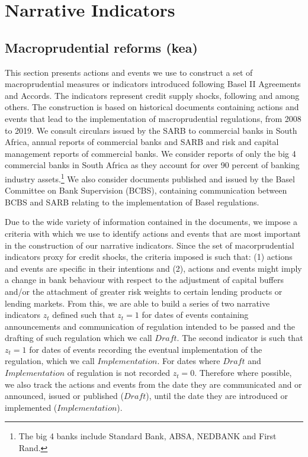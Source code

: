 \documentclass[
  letterpaper,
  DIV=11,
  numbers=noendperiod]{scrartcl}
\begin{document}
\section{Narrative Indicators}\label{narrative-indicators}

\subsection{Macroprudential reforms
(kea)}\label{macroprudential-reforms-kea}

This section presents actions and events we use to construct a set of
macroprudential measures or indicators introduced following Basel II
Agreements and Accords. The indicators represent credit supply shocks,
following \cite{noss2016estimating} and \cite{deli2017real} among
others. The construction is based on historical documents containing
actions and events that lead to the implementation of macroprudential
regulations, from 2008 to 2019. We consult circulars issued by the SARB
to commercial banks in South Africa, annual reports of commercial banks
and SARB and risk and capital management reports of commercial banks. We
consider reports of only the big 4 commercial banks in South Africa as
they account for over 90 percent of banking industry
assets.\footnote{The big 4 banks include Standard Bank, ABSA, NEDBANK and First Rand.}
We also consider documents published and issued by the Basel Committee
on Bank Supervision (BCBS), containing communication between BCBS and
SARB relating to the implementation of Basel regulations.

Due to the wide variety of information contained in the documents, we
impose a criteria with which we use to identify actions and events that
are most important in the construction of our narrative indicators.
Since the set of macorprudential indicators proxy for credit shocks, the
criteria imposed is such that: (1) actions and events are specific in
their intentions and (2), actions and events might imply a change in
bank behaviour with respect to the adjustment of capital buffers and/or
the attachment of greater risk weights to certain lending products or
lending markets. From this, we are able to build a series of two
narrative indicators \(z_{t}\) defined such that \(z_{t}=1\) for dates
of events containing announcements and communication of regulation
intended to be passed and the drafting of such regulation which we call
\(Draft\). The second indicator is such that \(z_{t}=1\) for dates of
events recording the eventual implementation of the regulation, which we
call \(Implementation\). For dates where \(Draft\) and
\(Implementation\) of regulation is not recorded \(z_{t}=0\). Therefore
where possible, we also track the actions and events from the date they
are communicated and or announced, issued or published (\(Draft\)),
until the date they are introduced or implemented (\(Implementation\)).
\end{document}
